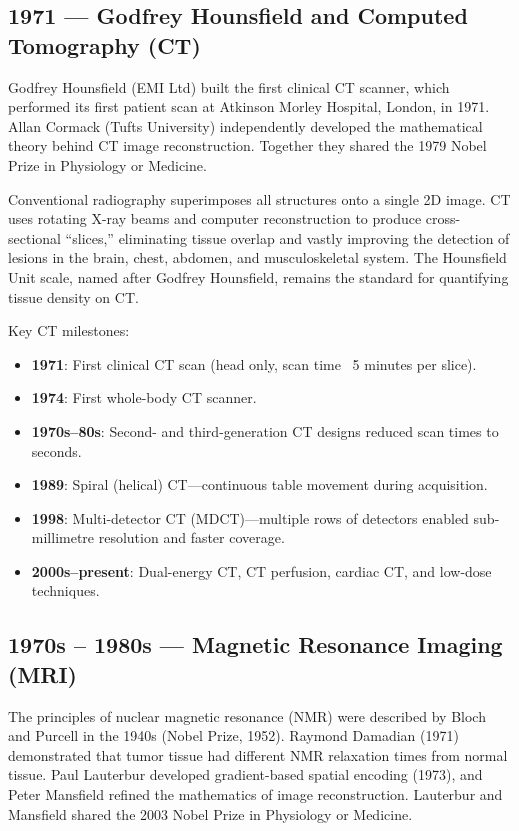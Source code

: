 \subsection*{1971 --- Godfrey Hounsfield and Computed Tomography (CT)}
Godfrey Hounsfield (EMI Ltd) built the first clinical CT scanner, which performed its first patient scan at Atkinson Morley Hospital, London, in 1971. Allan Cormack (Tufts University) independently developed the mathematical theory behind CT image reconstruction. Together they shared the 1979 Nobel Prize in Physiology or Medicine.

\begin{pearlbox}
Conventional radiography superimposes all structures onto a single 2D image. CT uses rotating X-ray beams and computer reconstruction to produce cross-sectional ``slices,'' eliminating tissue overlap and vastly improving the detection of lesions in the brain, chest, abdomen, and musculoskeletal system. The Hounsfield Unit scale, named after Godfrey Hounsfield, remains the standard for quantifying tissue density on CT.
\end{pearlbox}

Key CT milestones:
\begin{itemize}
    \item \textbf{1971}: First clinical CT scan (head only, scan time ~5 minutes per slice).
    \item \textbf{1974}: First whole-body CT scanner.
    \item \textbf{1970s--80s}: Second- and third-generation CT designs reduced scan times to seconds.
    \item \textbf{1989}: Spiral (helical) CT---continuous table movement during acquisition.
    \item \textbf{1998}: Multi-detector CT (MDCT)---multiple rows of detectors enabled sub-millimetre resolution and faster coverage.
    \item \textbf{2000s--present}: Dual-energy CT, CT perfusion, cardiac CT, and low-dose techniques.
\end{itemize}

\subsection*{1970s -- 1980s --- Magnetic Resonance Imaging (MRI)}
The principles of nuclear magnetic resonance (NMR) were described by Bloch and Purcell in the 1940s (Nobel Prize, 1952). Raymond Damadian (1971) demonstrated that tumor tissue had different NMR relaxation times from normal tissue. Paul Lauterbur developed gradient-based spatial encoding (1973), and Peter Mansfield refined the mathematics of image reconstruction. Lauterbur and Mansfield shared the 2003 Nobel Prize in Physiology or Medicine.

